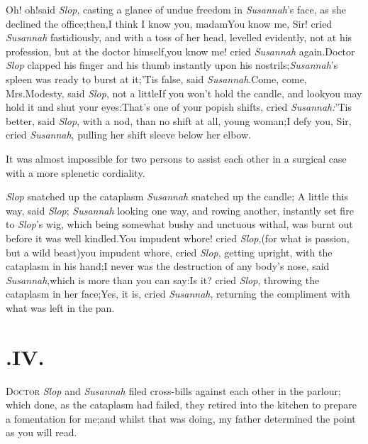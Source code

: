 \documentclass{article}
\begin{document}
\newpage
\tsh Oh! oh!\tsh said \textit{Slop},
casting a glance of undue freedom in \textit{Susannah}’s face,
as she declined the office;\tsk then,\break I think I know you,
madam\tsh You know me, Sir! cried \textit{Susannah}
fastidiously, and with a toss of her head, levelled evidently, not
at his profession, but at the doctor himself,\tsk you know\break
me! cried \textit{Susannah} again.\tsk Doctor \textit{Slop}
clapped his finger and his thumb instantly upon his
nostrils;\tsh \textit{Susannah}’s spleen was ready to
burst at it;\tsh ’Tis false, said
\textit{Susannah}.\tsk Come, come, Mrs.\@ Modesty, said \textit{Slop},
not a little\break{}\break\tsh If you won’t hold the candle, and
look\tsk you may hold it and shut your eyes:\tsk That’s
one of your popish shifts, cried \textit{Susannah:}\tsk ’Tis
better, said \textit{Slop}, with a nod, than no shift at all, young\pb
woman;\tsh I defy you, Sir, cried \textit{Susannah}, pulling
her shift sleeve below her elbow.

It was almost impossible for two persons to assist each other in
a surgical case with a more splenetic cordiality.


\textit{Slop} snatched up the cataplasm\tsh\break
\textit{Susannah} snatched up the candle;\tsh\break
A little this way, said \textit{Slop}; \textit{Susannah}
looking one way, and rowing another, instantly set fire to \textit{Slop}’s
wig, which being somewhat bushy and unctuous withal, was burnt out before it
was well kindled.\tsh You impudent whore! cried
\textit{Slop},\tsk (for what is passion, but a wild beast)\tsk you impudent
whore, cried \textit{Slop}, getting upright, with the cataplasm in his
hand;\tsh I never was the destruction of any body’s nose, said
\textit{Susannah},\tsk which is more than you can say:\pb\tsh Is it?
cried \textit{Slop}, throwing the cataplasm in her face;\tsh Yes, it is,
cried \textit{Susannah}, returning the compliment with what was left in the pan.\tsh

\vskip -6pt

\section{.\enspace IV.}

\lettrine{D}{octor} \textit{Slop} and
\textit{Susannah} filed cross-bills against each other in the
parlour; which done, as the cataplasm had failed, they retired into
the kitchen to prepare a fomentation for me;\tsk and whilst that was doing, my father determined the
point as you will read.
\end{document}
